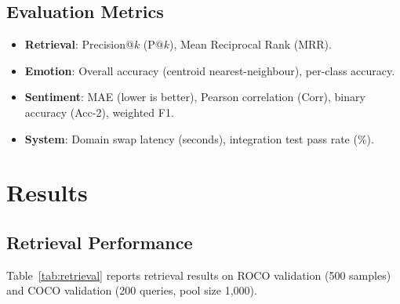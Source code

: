 \documentclass[10pt,conference]{IEEEtran}
\theoremstyle{ieeethm}
\theoremstyle{ieeedef}
\theoremstyle{ieeeremark}
\begin{document}
\subsection{Evaluation Metrics}

\begin{itemize}
  \item \textbf{Retrieval}: Precision@$k$ (P@$k$), Mean Reciprocal Rank (MRR).
  \item \textbf{Emotion}: Overall accuracy (centroid nearest-neighbour), per-class accuracy.
  \item \textbf{Sentiment}: MAE (lower is better), Pearson correlation (Corr), binary accuracy (Acc-2), weighted F1.
  \item \textbf{System}: Domain swap latency (seconds), integration test pass rate (\%).
\end{itemize}

\section{Results}
\label{sec:results}

\subsection{Retrieval Performance}

Table~\ref{tab:retrieval} reports retrieval results on ROCO validation (500 samples) and COCO validation (200 queries, pool size 1,000).

\begin{table}[!t]
\centering
\caption{Retrieval Results}
\label{tab:retrieval}
\end{table}
\end{document}
